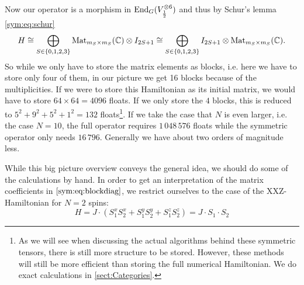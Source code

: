 Now our operator is a morphism in $\operatorname{End}_G(V_{\frac{1}{2}}^{\otimes 6})$ and thus
by Schur's lemma \eqref{sym:eq:schur}
\begin{equation}\label{sym:eq:blockdiag}
  H 
  \cong
  \bigoplus_{S \in \{0,1,2,3\}} 
  \mathrm{Mat}_{m_S \times m_S}(\mathbb{C}) 
  \otimes I_{2S+1}
  \cong 
  \bigoplus_{S \in \{0,1,2,3\}} 
  I_{2S+1} \otimes \mathrm{Mat}_{m_S \times m_S}(\mathbb{C}) .
\end{equation}
So while we only have to store the matrix elements as blocks, i.e. here we have
to store only four of them, in our picture we get 16 blocks because of the
multiplicities. If we were to store this Hamiltonian as its initial matrix, we
would have to store $64 \times 64 = 4096$ floats. If we only store the $4$
blocks, this is reduced to $5^2 + 9^2 + 5^2 + 1^2 = 132$ floats\footnote{As we
will see when discussing the actual algorithms behind these symmetric tensors,
there is still more structure to be stored. However, these methods will still be
more efficient than storing the full numerical Hamiltonian. We do exact
calculations in \cref{sect:Categories}.}. If we take the case that $N$ is even
larger, i.e. the case $N = 10$, the full operator requires $1\,048\,576$ floats
while the symmetric operator only needs $16\,796$. Generally we have about two
orders of magnitude less.

While this big picture overview conveys the general idea, we should do some of
the calculations by hand. In order to get an interpretation of the matrix
coefficients in $\cref{sym:eq:blockdiag}$, we restrict ourselves to the case of
the XXZ-Hamiltonian for $N = 2$ spins:
\[
  H = J \cdot (S_1^x S_2^x + S_1^y S_2^y + S_1^z S_2^z) = J \cdot S_1 \cdot S_2
\]

